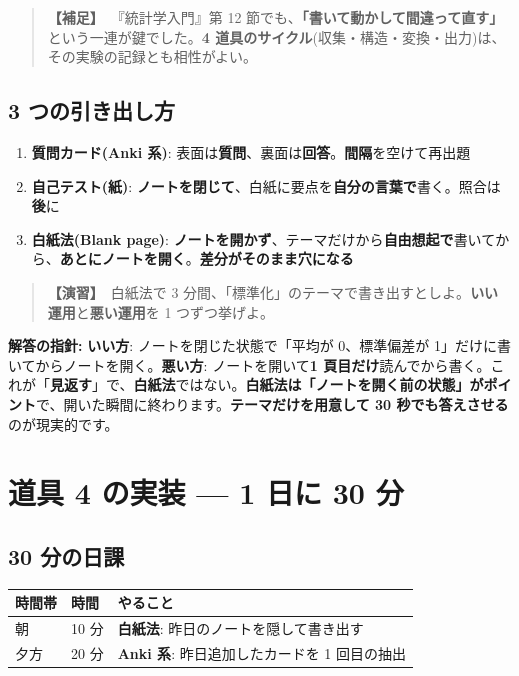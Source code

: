 \documentclass{article}
\begin{document}
\begin{quote}
\textbf{【補足】}\ 『統計学入門』第 12 節でも、\textbf{「書いて動かして間違って直す」}という一連が鍵でした。\textbf{4 道具のサイクル}(収集・構造・変換・出力)は、その実験の記録とも相性がよい。
\end{quote}

\subsection{3 つの引き出し方}

\begin{enumerate}
\item \textbf{質問カード(Anki 系)}: 表面は\textbf{質問}、裏面は\textbf{回答}。\textbf{間隔}を空けて再出題
\item \textbf{自己テスト(紙)}: \textbf{ノートを閉じて}、白紙に要点を\textbf{自分の言葉で}書く。照合は\textbf{後}に
\item \textbf{白紙法(Blank page)}: \textbf{ノートを開かず}、テーマだけから\textbf{自由想起で}書いてから、\textbf{あとにノートを開く}。\textbf{差分がそのまま穴になる}
\end{enumerate}

\begin{quote}
\textbf{【演習】}\ 白紙法で 3 分間、「標準化」のテーマで書き出すとしよ。\textbf{いい運用}と\textbf{悪い運用}を 1 つずつ挙げよ。
\end{quote}

\textbf{解答の指針:} \textbf{いい方}: ノートを閉じた状態で「平均が 0、標準偏差が 1」だけに書いてからノートを開く。\textbf{悪い方}: ノートを開いて\textbf{1 頁目だけ}読んでから書く。これが「\textbf{見返す}」で、\textbf{白紙法}ではない。\textbf{白紙法は「ノートを開く前の状態」がポイント}で、開いた瞬間に終わります。\textbf{テーマだけを用意して 30 秒でも答えさせる}のが現実的です。

\section{道具 4 の実装 — 1 日に 30 分}

\subsection{30 分の日課}

\begin{center}
\begin{tabular}{|l|l|l|}
\hline
時間帯 & 時間 & やること \\
\hline
朝 & 10 分 & \textbf{白紙法}: 昨日のノートを隠して書き出す \\
\hline
夕方 & 20 分 & \textbf{Anki 系}: 昨日追加したカードを 1 回目の抽出 \\
\hline
\end{tabular}
\end{center}
\end{document}
